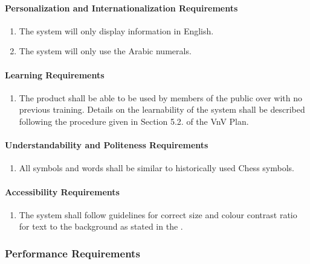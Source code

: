 \documentclass[12pt]{article}
\begin{document}
{\paragraph{Personalization and Internationalization Requirements}
\begin{enumerate}[{UH}1., leftmargin=2\parindent, resume]
    \item The system will only display information in English.
    \item The system will only use the Arabic numerals.
\end{enumerate}

\paragraph{Learning Requirements}
\begin{enumerate}[{UH}1., leftmargin=2\parindent, resume]
    \item The product shall be able to be used by members of the public over with no previous training. Details on the learnability 
    of the system shall be described following the procedure given in Section 5.2.\thevnvSectionNfr{}
    of the VnV Plan.
\end{enumerate}

\paragraph{Understandability and Politeness Requirements}
\begin{enumerate}[{UH}1., leftmargin=2\parindent, resume]
    \item All symbols and words shall be similar to historically used Chess symbols. \cite{ChessHistory2003}
\end{enumerate}

\paragraph{Accessibility Requirements}
\begin{enumerate}[{UH}1., leftmargin=2\parindent, resume]
    \item The system shall follow guidelines for correct size and colour contrast ratio for text to the background as stated in the \cite{WCAG2018}.
\end{enumerate}



\subsubsection{Performance Requirements}
\label{NFR_PR}
}
\end{document}
